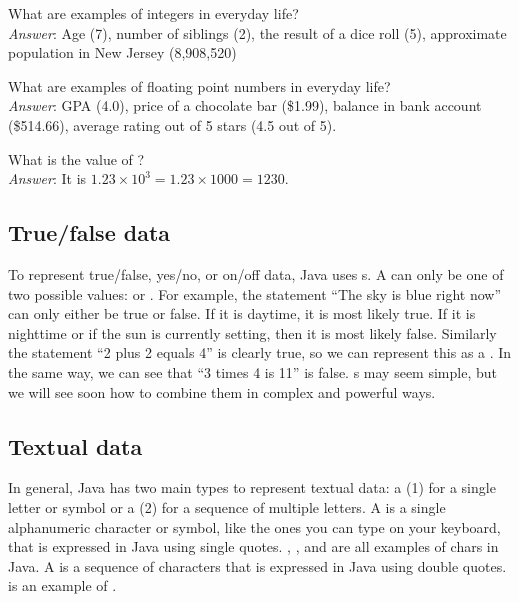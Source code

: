 \begin{example}
What are examples of integers in everyday life? \\

\noindent \emph{Answer}: Age (7), number of siblings (2), the result of a dice roll (5), approximate population in New Jersey (8,908,520)
\end{example}

\begin{example}
What are examples of floating point numbers in everyday life? \\

\noindent \emph{Answer}: GPA (4.0), price of a chocolate bar (\$1.99), balance in bank account (\$514.66), average rating out of 5 stars (4.5 out of 5).
\end{example}

\begin{example}
What is the value of ? \\

\noindent \emph{Answer}: It is $1.23 \times 10^3 = 1.23 \times 1000 = 1230$.
\end{example}

\subsection{True/false data}
To represent true/false, yes/no, or on/off data, Java uses s. A  can only be one of two possible values:  or . For example, the statement ``The sky is blue right now'' can only either be true or false. If it is daytime, it is most likely true. If it is nighttime or if the sun is currently setting, then it is most likely false. Similarly the statement ``2 plus 2 equals 4'' is clearly true, so we can represent this as a . In the same way, we can see that ``3 times 4 is 11'' is false. s may seem simple, but we will see soon how to combine them in complex and powerful ways.

\subsection{Textual data}
In general, Java has two main types to represent textual data: a (1)  for a single letter or symbol or a (2)  for a sequence of multiple letters. A  is a single alphanumeric character or symbol, like the ones you can type on your keyboard, that is expressed in Java using single quotes. , , and  are all examples of chars in Java. A  is a sequence of characters that is expressed in Java using double quotes.  is an example of .

